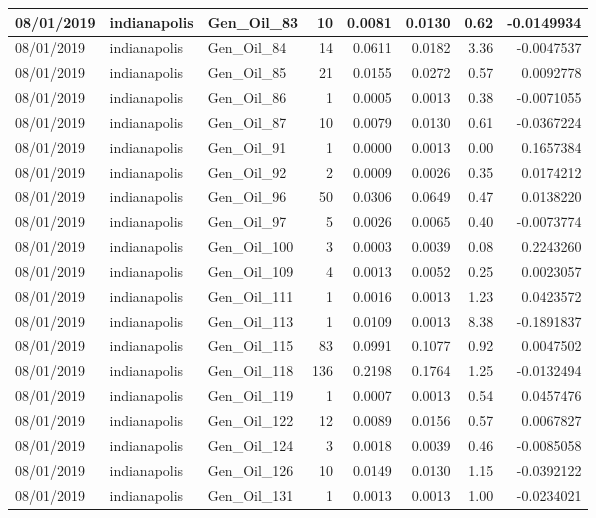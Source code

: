 \documentclass[
  letterpaper,
  DIV=11,
  numbers=noendperiod]{scrartcl}
\begin{document}
\begin{tabular}{l|l|l|r|r|r|r|r}
\hline
08/01/2019 & indianapolis & Gen\_Oil\_83 & 10 & 0.0081 & 0.0130 & 0.62 & -0.0149934\\
\hline
08/01/2019 & indianapolis & Gen\_Oil\_84 & 14 & 0.0611 & 0.0182 & 3.36 & -0.0047537\\
\hline
08/01/2019 & indianapolis & Gen\_Oil\_85 & 21 & 0.0155 & 0.0272 & 0.57 & 0.0092778\\
\hline
08/01/2019 & indianapolis & Gen\_Oil\_86 & 1 & 0.0005 & 0.0013 & 0.38 & -0.0071055\\
\hline
08/01/2019 & indianapolis & Gen\_Oil\_87 & 10 & 0.0079 & 0.0130 & 0.61 & -0.0367224\\
\hline
08/01/2019 & indianapolis & Gen\_Oil\_91 & 1 & 0.0000 & 0.0013 & 0.00 & 0.1657384\\
\hline
08/01/2019 & indianapolis & Gen\_Oil\_92 & 2 & 0.0009 & 0.0026 & 0.35 & 0.0174212\\
\hline
08/01/2019 & indianapolis & Gen\_Oil\_96 & 50 & 0.0306 & 0.0649 & 0.47 & 0.0138220\\
\hline
08/01/2019 & indianapolis & Gen\_Oil\_97 & 5 & 0.0026 & 0.0065 & 0.40 & -0.0073774\\
\hline
08/01/2019 & indianapolis & Gen\_Oil\_100 & 3 & 0.0003 & 0.0039 & 0.08 & 0.2243260\\
\hline
08/01/2019 & indianapolis & Gen\_Oil\_109 & 4 & 0.0013 & 0.0052 & 0.25 & 0.0023057\\
\hline
08/01/2019 & indianapolis & Gen\_Oil\_111 & 1 & 0.0016 & 0.0013 & 1.23 & 0.0423572\\
\hline
08/01/2019 & indianapolis & Gen\_Oil\_113 & 1 & 0.0109 & 0.0013 & 8.38 & -0.1891837\\
\hline
08/01/2019 & indianapolis & Gen\_Oil\_115 & 83 & 0.0991 & 0.1077 & 0.92 & 0.0047502\\
\hline
08/01/2019 & indianapolis & Gen\_Oil\_118 & 136 & 0.2198 & 0.1764 & 1.25 & -0.0132494\\
\hline
08/01/2019 & indianapolis & Gen\_Oil\_119 & 1 & 0.0007 & 0.0013 & 0.54 & 0.0457476\\
\hline
08/01/2019 & indianapolis & Gen\_Oil\_122 & 12 & 0.0089 & 0.0156 & 0.57 & 0.0067827\\
\hline
08/01/2019 & indianapolis & Gen\_Oil\_124 & 3 & 0.0018 & 0.0039 & 0.46 & -0.0085058\\
\hline
08/01/2019 & indianapolis & Gen\_Oil\_126 & 10 & 0.0149 & 0.0130 & 1.15 & -0.0392122\\
\hline
08/01/2019 & indianapolis & Gen\_Oil\_131 & 1 & 0.0013 & 0.0013 & 1.00 & -0.0234021\\

\end{tabular}
\end{document}
